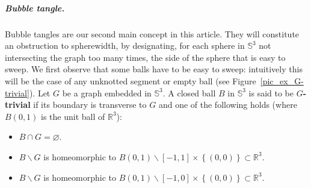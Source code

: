 \documentclass[11pt,a4paper]{article}
\newcommand\ens[1]{\left\{ #1 \right\}}
\newcommand{\Sp}{\mathbb S}
\newcommand{\bfdex}[1]{\textbf{#1}\index{#1}}
\begin{document}
\subparagraph*{Bubble tangle.} Bubble tangles are our second main concept in this article. They will constitute an obstruction to spherewidth, by designating, for each sphere in $\Sp^3$ not intersecting the graph too many times, the side of the sphere that is easy to sweep. We first observe that some balls have to be easy to sweep: intuitively this will be the case of any unknotted segment or empty ball (see Figure~\ref{pic_ex_G-trivial}).
Let $G$ be a graph embedded in $\Sp^3$. A closed ball $B$ in $\Sp^3$ is said to be \bfdex{$G$-trivial} if its boundary is transverse to $G$ and one of the following holds (where $B(0,1)$ is the unit ball of $\mathbb{R}^3$):
\begin{itemize}
	\item $B \cap G = \varnothing$.
	\item $B \smallsetminus G$ is homeomorphic to $
	B(0,1) \smallsetminus [-1,1]\times \ens{(0,0)} \subset \mathbb{R}^3$.
	\item $B \smallsetminus G$ is homeomorphic to $
	B(0,1) \smallsetminus [-1,0]\times \ens{(0,0)} \subset \mathbb{R}^3$.
\end{itemize} 
\end{document}
